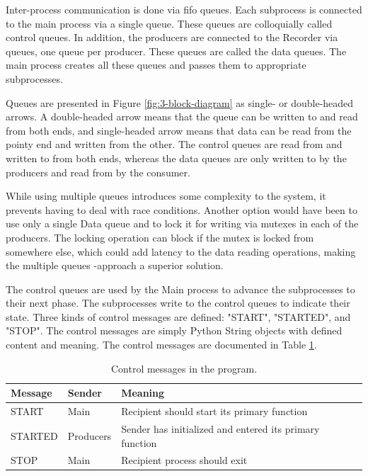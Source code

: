 Inter-process communication is done via \gls{fifo} queues.
Each subprocess is connected to the main process via a single queue.
These queues are colloquially called control queues.
In addition, the producers are connected to the Recorder via queues,
one queue per producer. These queues are called the data queues.
The main process creates all these queues and passes them to appropriate subprocesses.

Queues are presented in Figure \ref{fig:3-block-diagram} as single- or double-headed arrows.
A double-headed arrow means that the queue can be written to and read from both ends,
and single-headed arrow means that data can be read from the pointy end and written from the other.
The control queues are read from and written to from both ends,
whereas the data queues are only written to by the producers and read from by the consumer.

While using multiple queues introduces some complexity to the system,
it prevents having to deal with race conditions.
Another option would have been to use only a single Data queue
and to lock it for writing via mutexes in each of the producers.
The locking operation can block if the mutex is locked from somewhere else,
which could add latency to the data reading operations,
making the multiple queues -approach a superior solution.

The control queues are used by the Main process to advance the subprocesses to their next phase.
The subprocesses write to the control queues to indicate their state.
Three kinds of control messages are defined: "START", "STARTED", and "STOP".
The control messages are simply Python String objects with defined content and meaning.
The control messages are documented in Table \ref{tab:control-messages}.

\begin{table}[H]
    \centering
    \begin{tabular}{l l l}
        \toprule
        \textbf{Message} & \textbf{Sender} & \textbf{Meaning} \\
        \midrule
        START & Main & Recipient should start its primary function \\
        STARTED & Producers & Sender has initialized and entered its primary function \\
        STOP & Main & Recipient process should exit \\
        \bottomrule
    \end{tabular}
    \caption{Control messages in the program.}
    \label{tab:control-messages}
\end{table}

